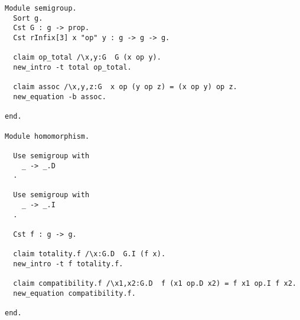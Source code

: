 \begin{verbatim}
Module semigroup.
  Sort g.
  Cst G : g -> prop.
  Cst rInfix[3] x "op" y : g -> g -> g.

  claim op_total /\x,y:G  G (x op y).
  new_intro -t total op_total.

  claim assoc /\x,y,z:G  x op (y op z) = (x op y) op z.
  new_equation -b assoc.

end.

Module homomorphism.

  Use semigroup with
    _ -> _.D
  .

  Use semigroup with
    _ -> _.I
  .

  Cst f : g -> g. 

  claim totality.f /\x:G.D  G.I (f x).
  new_intro -t f totality.f.

  claim compatibility.f /\x1,x2:G.D  f (x1 op.D x2) = f x1 op.I f x2.
  new_equation compatibility.f.

end.
\end{verbatim}











